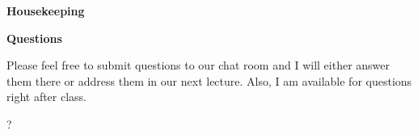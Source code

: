 \begin{frame}\begin{center}
	\LARGE\textbf{Housekeeping}
\end{center}\end{frame}
\begin{frame}
	\textbf{Questions}\vspace{0.3cm}

Please feel free to submit questions to our chat room and I will either answer them there or address them in our next lecture. Also, I am available for questions right after class.

\end{frame}
\begin{frame}\begin{center}
{\fontsize{125}{60}\selectfont ?}
\end{center}\end{frame}
